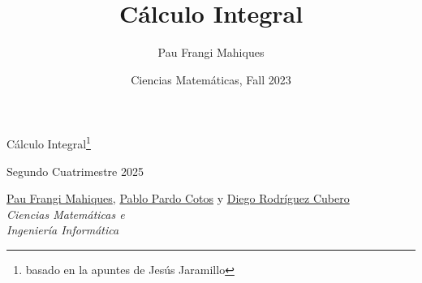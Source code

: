\documentclass[a4paper,11pt,final]{article}
\title{Cálculo Integral}
\date{Ciencias Matemáticas, Fall 2023}
\author{Pau Frangi Mahiques}
\begin{document}
\begin{titlepage}
    \centering\Large\null\vfill

    {\Huge Cálculo Integral\footnote{basado en la apuntes de Jesús Jaramillo}}\\ 
    \vspace{1em}

    Segundo Cuatrimestre 2025\\
    \vskip8cm

    \href{https://github.com/Pau-Frangi}{Pau Frangi Mahiques}, \href{https://github.com/PabloPC05}{Pablo Pardo Cotos} y \href{https://github.com/DIEGOROCU}{Diego Rodríguez Cubero}\\

    \emph{Ciencias Matemáticas e\\Ingeniería Informática}\\
    \vskip4cm
\end{titlepage}

\newpage
\tableofcontents
\newpage


\end{document}
